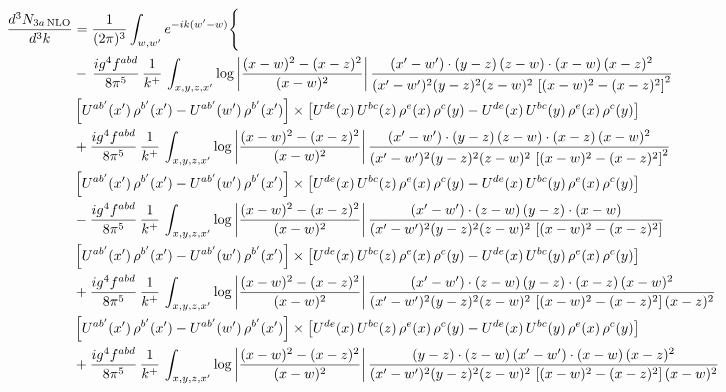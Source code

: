 \documentclass[9pt]{article}
\numberwithin{equation}{section}
\begin{document}
\begin{align}
\frac{d^{3}N_{3a\,\rm NLO}}{d^{3}k} & = \frac{1}{(2\pi)^{3}}\int_{w,w'}e^{-ik(w'-w)}\Bigg\{\notag \\
& -\,\frac{ig^{4}f^{abd}}{8\pi^{5}}\,\frac{1}{k^{+}}\,\int_{x,y,z,x'}\log{\left|\frac{(x-w)^{2}-(x-z)^{2}}{(x-w)^{2}}\right|}\,
\frac{(x'-w')\cdot(y-z)\,(z-w)\cdot(x-w)\,(x-z)^{2}}{(x'-w')^{2}(y-z)^{2}(z-w)^{2}\,\left[(x-w)^{2}-(x-z)^{2}\right]^{2}}\notag \\ & \left[U^{ab'}(x')\,\rho^{b'}(x')-U^{ab'}(w')\, \rho^{b'}(x')\right]\times \left[U^{de}(x)\,U^{bc}(z)\, \rho^{e}(x)\,\rho^{c}(y)-U^{de}(x)\,U^{bc}(y)\,\rho^{e}(x)\,\rho^{c}(y)\right] \notag \\
& +\frac{ig^{4}f^{abd}}{8\pi^{5}}\,\frac{1}{k^{+}}\,\int_{x,y,z,x'}\log{\left|\frac{(x-w)^{2}-(x-z)^{2}}{(x-w)^{2}}\right|}\,
\frac{(x'-w')\cdot(y-z)\,(z-w)\cdot(x-z)\,(x-w)^{2}}{(x'-w')^{2}(y-z)^{2}(z-w)^{2}\,\left[(x-w)^{2}-(x-z)^{2}\right]^{2}}\notag \\ 
&\left[U^{ab'}(x')\,\rho^{b'}(x')-U^{ab'}(w')\, \rho^{b'}(x')\right]\times \left[U^{de}(x)\,U^{bc}(z)\, \rho^{e}(x)\,\rho^{c}(y)-U^{de}(x)\,U^{bc}(y)\,\rho^{e}(x)\,\rho^{c}(y)\right] \notag \\
& -\frac{ig^{4}f^{abd}}{8\pi^{5}}\,\frac{1}{k^{+}}\,\int_{x,y,z,x'}\log{\left|\frac{(x-w)^{2}-(x-z)^{2}}{(x-w)^{2}}\right|}\,
\frac{(x'-w')\cdot(z-w)\,(y-z)\cdot(x-w)}{(x'-w')^{2}(y-z)^{2}(z-w)^{2}\,\left[(x-w)^{2}-(x-z)^{2}\right]}\notag \\ & \left[U^{ab'}(x')\,\rho^{b'}(x')-U^{ab'}(w')\, \rho^{b'}(x')\right]\times \left[U^{de}(x)\,U^{bc}(z)\, \rho^{e}(x)\,\rho^{c}(y)-U^{de}(x)\,U^{bc}(y)\,\rho^{e}(x)\,\rho^{c}(y)\right] \notag \\
&  +\frac{ig^{4}f^{abd}}{8\pi^{5}}\,\frac{1}{k^{+}}\,\int_{x,y,z,x'}\log{\left|\frac{(x-w)^{2}-(x-z)^{2}}{(x-w)^{2}}\right|}\,
\frac{(x'-w')\cdot(z-w)\,(y-z)\cdot(x-z)\,(x-w)^{2}}{(x'-w')^{2}(y-z)^{2}(z-w)^{2}\,\left[(x-w)^{2}-(x-z)^{2}\right](x-z)^{2}}\notag \\ & \left[U^{ab'}(x')\,\rho^{b'}(x')-U^{ab'}(w')\, \rho^{b'}(x')\right]\times \left[U^{de}(x)\,U^{bc}(z)\, \rho^{e}(x)\,\rho^{c}(y)-U^{de}(x)\,U^{bc}(y)\,\rho^{e}(x)\,\rho^{c}(y)\right] \notag \\
& +\frac{ig^{4}f^{abd}}{8\pi^{5}}\,\frac{1}{k^{+}}\,\int_{x,y,z,x'}\log{\left|\frac{(x-w)^{2}-(x-z)^{2}}{(x-w)^{2}}\right|}\,
\frac{(y-z)\cdot(z-w)\,(x'-w')\cdot(x-w)\,(x-z)^{2}}{(x'-w')^{2}(y-z)^{2}(z-w)^{2}\,\left[(x-w)^{2}-(x-z)^{2}\right](x-w)^{2}}\notag \\ 

\end{align}
\end{document}
